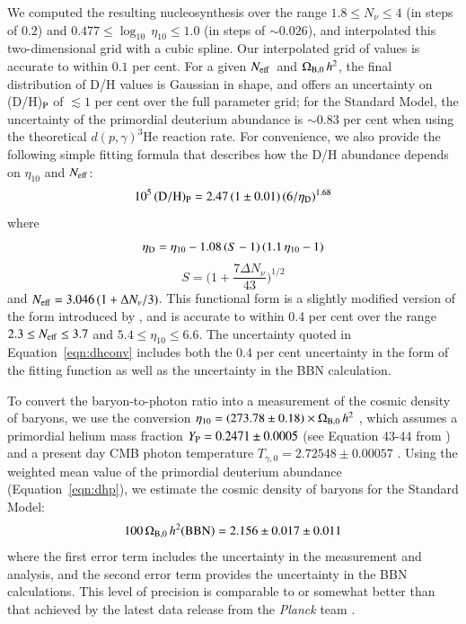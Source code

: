 \documentclass[12pt,preprint,useAMS,usenatbib]{emulateapj}
\newcommand{\neff}{$N_{\rm eff}$}
\newcommand{\obhh}{$\Omega_{\rm B,0}\,h^{2}$}
\begin{document}
We computed the resulting nucleosynthesis over the range
$1.8\le{N_{\nu}}\le4$ (in steps of $0.2$) and
$0.477\le\log_{10}\,\eta_{10}\le1.0$ (in steps of $\sim0.026$), and
interpolated this two-dimensional grid with a cubic spline.
Our interpolated grid of values is accurate to within $0.1$
per cent. For a given \neff\ and \obhh, the final
distribution of D/H values is Gaussian in shape, and
offers an uncertainty on (D/H)$_{\rm P}$ of $\lesssim1$ per cent
over the full parameter grid;
for the Standard Model, the uncertainty of the primordial
deuterium abundance is $\sim0.83$ per cent when using the
theoretical $d(p,\gamma)^3\mathrm{He}$ reaction rate. For convenience,
we also provide the following simple fitting formula that describes
how the D/H abundance depends on $\eta_{10}$ and \neff:
\begin{equation}
\label{eqn:dhconv}
10^{5}\,({\rm D/H})_{\rm P} = 2.47\,(1\pm0.01)\,(6/\eta_{\rm D})^{1.68}
\end{equation}
where
\begin{equation}
\eta_{\rm D} = \eta_{10} - 1.08\,(S-1)\,(1.1\,\eta_{10}-1)
\end{equation}
\begin{equation}
\label{eqn:dhconvb}
S = \Big(1+\frac{7\Delta N_{\nu}}{43}\Big)^{1/2}
\end{equation}
and $N_{\rm eff} = 3.046\,(1 + \Delta N_{\nu}/3)$. This functional form
is a slightly modified version of the form introduced by \citet{KneSte04},
and is accurate to within 0.4 per cent over the range 
$2.3\le{N_{\rm eff}}\le3.7$ and $5.4\le\eta_{10}\le6.6$.
The uncertainty quoted in Equation~\ref{eqn:dhconv}
includes both the 0.4 per cent uncertainty in the form of the
fitting function as well as the uncertainty in the BBN calculation.

To convert the baryon-to-photon ratio into a measurement of
the cosmic density of baryons, we use the conversion
$\eta_{10}=(273.78\pm0.18)\times\Omega_{\rm B,0}\,h^{2}$ \citep{Ste06},
which assumes a primordial helium mass fraction
$Y_{\rm P}=0.2471\pm0.0005$ (see Equation 43-44 from \citealt{LopTur99})
and a present day CMB photon temperature
$T_{\gamma,0}=2.72548\pm0.00057$ \citep{Fix09}.
Using the weighted mean value of the primordial
deuterium abundance (Equation~\ref{eqn:dhp}),
we estimate the cosmic density of baryons for the
Standard Model:
\begin{equation}
\label{eqn:obhhbbn}
100\,\Omega_{\rm B,0}\,h^{2}({\rm BBN}) = 2.156\pm0.017\pm0.011
\end{equation}
where the first error term includes the uncertainty in the
measurement and analysis, and the second error term
provides the uncertainty in the BBN calculations.
This level of precision is comparable to or somewhat
better than that achieved by the latest data release from
the \textit{Planck} team \citep{Efs15}.
\end{document}
